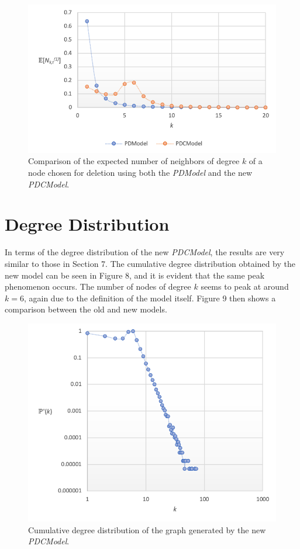 \documentclass[final,3p,times,twocolumn]{elsarticle}
\begin{document}
\begin{figure}[h]
\centering\includegraphics[width=1\linewidth]{degree-distribution-comparison.png}
\caption{Comparison of the expected number of neighbors of degree $k$ of a node chosen for deletion using both the \textit{PDModel} and the new \textit{PDCModel}.}
\end{figure}

\section{Degree Distribution}
\label{S:8}

In terms of the degree distribution of the new \textit{PDCModel}, the results are very similar to those in Section 7. The cumulative degree distribution obtained by the new model can be seen in Figure 8, and it is evident that the same peak phenomenon occurs. The number of nodes of degree $k$ seems to peak at around $k = 6$, again due to the definition of the model itself. Figure 9 then shows a comparison between the old and new models.

\begin{figure}[h]
\centering\includegraphics[width=1\linewidth]{cumulative-distribution.png}
\caption{Cumulative degree distribution of the graph generated by the new \textit{PDCModel}.}
\end{figure}
\end{document}
